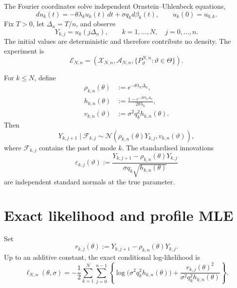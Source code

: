 \documentclass[11pt]{article}
\theoremstyle{remark}
\newcommand{\1}{\mathbf 1}
\newcommand{\elln}{\ell_{N,n}}
\newcommand{\vart}{\vartheta}
\begin{document}
The Fourier coordinates solve independent Ornstein--Uhlenbeck equations,
\begin{equation}\label{eq:mode}
 du_k(t)=-\theta\lambda_ku_k(t)\,dt+\sigma q_kd\beta_k(t),
 \qquad u_k(0)=u_{0,k}.
\end{equation}
Fix $T>0$, let $\Delta_n=T/n$, and observe
\[
 Y_{k,j}=u_k(j\Delta_n),
 \qquad k=1,\ldots,N,
 \quad j=0,\ldots,n.
\]
The initial values are deterministic and therefore contribute no density.  The experiment is
\[
 \mathcal E_{N,n}
 =\left(\mathcal X_{N,n},\mathcal A_{N,n},
 \{P_{\vart}^{N,n}:\vart\in\Theta\}\right).
\]

For $k\le N$, define
\begin{align}
 \rho_{k,n}(\theta)
 &:=e^{-\theta\lambda_k\Delta_n},\label{eq:rho}\\
 h_{k,n}(\theta)
 &:=\frac{1-e^{-2\theta\lambda_k\Delta_n}}
 {2\theta\lambda_k},\label{eq:h}\\
 v_{k,n}(\vart)
 &:=\sigma^2q_k^2h_{k,n}(\theta).\label{eq:v}
\end{align}
Then
\begin{equation}\label{eq:transition}
 Y_{k,j+1}\mid\mathcal F_{k,j}
 \sim\mathcal N\!\left(
 \rho_{k,n}(\theta)Y_{k,j},
 v_{k,n}(\vart)
 \right),
\end{equation}
where $\mathcal F_{k,j}$ contains the past of mode $k$.  The standardised innovations
\begin{equation}\label{eq:eps}
 \varepsilon_{k,j}(\vart)
 :=\frac{Y_{k,j+1}-\rho_{k,n}(\theta)Y_{k,j}}
 {\sigma q_k\sqrt{h_{k,n}(\theta)}}
\end{equation}
are independent standard normals at the true parameter.

\section{Exact likelihood and profile MLE}

Set
\[
 r_{k,j}(\theta)
 :=Y_{k,j+1}-\rho_{k,n}(\theta)Y_{k,j}.
\]
Up to an additive constant, the exact conditional log-likelihood is
\begin{equation}\label{eq:loglik}
 \elln(\theta,\sigma)
 =-\frac12\sum_{k=1}^N\sum_{j=0}^{n-1}
 \left\{
 \log\big(\sigma^2q_k^2h_{k,n}(\theta)\big)
 +\frac{r_{k,j}(\theta)^2}
 {\sigma^2q_k^2h_{k,n}(\theta)}
 \right\}.
\end{equation}
\end{document}

